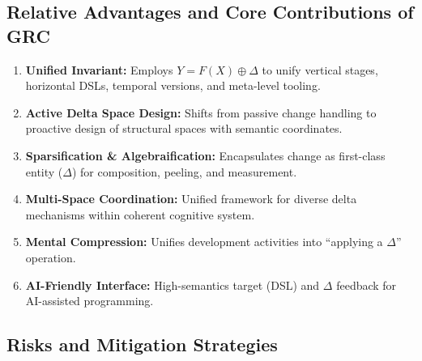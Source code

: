 \documentclass[11pt]{article}
\begin{document}
\subsection{Relative Advantages and Core Contributions of GRC}
\label{subsec:advantages}

\begin{enumerate}
    \item \textbf{Unified Invariant:} Employs $Y = F(X) \oplus \Delta$ to unify vertical stages, horizontal DSLs, temporal versions, and meta-level tooling.
    
    \item \textbf{Active Delta Space Design:} Shifts from passive change handling to proactive design of structural spaces with semantic coordinates.
    
    \item \textbf{Sparsification \& Algebraification:} Encapsulates change as first-class entity ($\Delta$) for composition, peeling, and measurement.
    
    \item \textbf{Multi-Space Coordination:} Unified framework for diverse delta mechanisms within coherent cognitive system.
    
    \item \textbf{Mental Compression:} Unifies development activities into ``applying a $\Delta$'' operation.
    
    \item \textbf{AI-Friendly Interface:} High-semantics target (DSL) and $\Delta$ feedback for AI-assisted programming.
\end{enumerate}

\subsection{Risks and Mitigation Strategies}
\label{subsec:risks}
\end{document}
